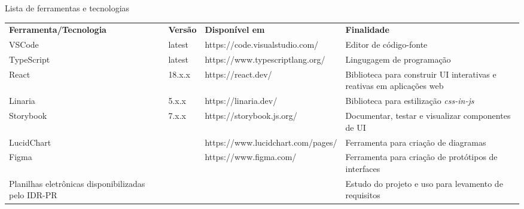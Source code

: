 \begin{tabframed}[htb]
  \caption{Lista de ferramentas e tecnologias}
  \label{quad:materiais}
  \renewcommand{\arraystretch}{2}
  \begin{tabular}{|l|l|l|l|}
    \cline{1-4}
    \textbf{Ferramenta/Tecnologia}    &
    \textbf{Versão}                   &
    \textbf{Disponível em}            &
    \textbf{Finalidade}
    \\ \cline{1-4}

    \gls{VSCode}                      &
    latest                            &
    https://code.visualstudio.com/    &
    Editor de código-fonte
    \\ \cline{1-4}

    TypeScript                        &
    latest                            &
    https://www.typescriptlang.org/   &
    Lingugagem de programação
    \\ \cline{1-4}

    React                             &
    18.x.x                            &
    https://react.dev/                &
    \multicolumn{1}{|p{4cm}|}{\raggedright Biblioteca para construir \gls{UI} interativas e reativas em aplicações web}
    \\ \cline{1-4}

    Linaria                           &
    5.x.x                             &
    https://linaria.dev/              &
    \multicolumn{1}{|p{4cm}|}{\raggedright Biblioteca para estilização \textit{css-in-js}}
    \\ \cline{1-4}

    Storybook                         &
    7.x.x                             &
    https://storybook.js.org/         &
    \multicolumn{1}{|p{4cm}|}{\raggedright Documentar, testar e visualizar componentes de \gls{UI}}
    \\ \cline{1-4}

    LucidChart                        &
                                      &
    https://www.lucidchart.com/pages/ &
    \multicolumn{1}{|p{4cm}|}{\raggedright Ferramenta para criação de diagramas}
    \\ \cline{1-4}

    Figma                             &
                                      &
    https://www.figma.com/            &
    \multicolumn{1}{|p{4cm}|}{\raggedright Ferramenta para criação de protótipos de interfaces}
    \\ \cline{1-4}

    \multicolumn{1}{|p{4cm}|}{\raggedright Planilhas eletrônicas disponibilizadas pelo \gls{IDR-PR}} 
                                      &
                                      &
                                      &
    \multicolumn{1}{|p{4cm}|}{\raggedright Estudo do projeto e uso para levamento de requisitos}
    \\ \cline{1-4}
  \end{tabular}
  \fonte{}%
\end{tabframed}

